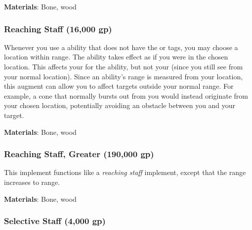 \vspace{0.25em}
\textbf{Materials}: Bone, wood


\lowercase{\hypertarget{item:Reaching Staff}{}}\label{item:Reaching Staff}
\hypertarget{item:Reaching Staff}{\subsubsection{Reaching Staff\hfill{} (16,000 gp)}}

Whenever you use a  ability that does not have the  or  tags, you may choose a location within \rngclose range.
The ability takes effect as if you were in the chosen location.
This affects your  for the ability, but not your  (since you still see from your normal location).
Since an ability's range is measured from your location, this augment can allow you to affect targets outside your normal range.
For example, a cone that normally bursts out from you would instead originate from your chosen location, potentially avoiding an obstacle between you and your target.



\vspace{0.25em}
\textbf{Materials}: Bone, wood


\lowercase{\hypertarget{item:Reaching Staff, Greater}{}}\label{item:Reaching Staff, Greater}
\hypertarget{item:Reaching Staff, Greater}{\subsubsection{Reaching Staff, Greater\hfill{} (190,000 gp)}}

This implement functions like a \textit{reaching staff} implement, except that the range increases to \rngmed range.



\vspace{0.25em}
\textbf{Materials}: Bone, wood


\lowercase{\hypertarget{item:Selective Staff}{}}\label{item:Selective Staff}
\hypertarget{item:Selective Staff}{\subsubsection{Selective Staff\hfill{} (4,000 gp)}}

